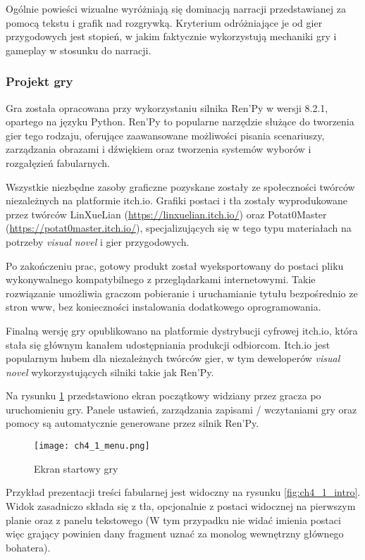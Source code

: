 Ogólnie powieści wizualne wyróżniają się dominacją narracji przedstawianej za pomocą tekstu i grafik nad
rozgrywką. Kryterium odróżniające je od gier przygodowych jest stopień, w jakim faktycznie
wykorzystują mechaniki gry i gameplay w stosunku do narracji\cite{tvtropes_visual_novel}.

\subsubsection*{Projekt gry}

Gra została opracowana przy wykorzystaniu silnika Ren'Py w wersji 8.2.1, opartego na języku Python.
Ren'Py to popularne narzędzie służące do tworzenia gier tego rodzaju, oferujące zaawansowane
możliwości pisania scenariuszy, zarządzania obrazami i dźwiękiem oraz tworzenia systemów wyborów
i rozgałęzień fabularnych.

Wszystkie niezbędne zasoby graficzne pozyskane zostały ze społeczności twórców niezależnych na
platformie itch.io. Grafiki postaci i tła zostały wyprodukowane przez twórców
LinXueLian (\url{https://linxuelian.itch.io/}) oraz Potat0Master (\url{https://potat0master.itch.io/}),
specjalizujących się w tego typu materiałach na potrzeby \textit{visual novel} i gier przygodowych.

Po zakończeniu prac, gotowy produkt został wyeksportowany do postaci pliku wykonywalnego
kompatybilnego z przeglądarkami internetowymi. Takie rozwiązanie umożliwia graczom pobieranie i
uruchamianie tytułu bezpośrednio ze stron www, bez konieczności instalowania dodatkowego
oprogramowania.

Finalną wersję gry opublikowano na platformie dystrybucji cyfrowej itch.io, która stała się
głównym kanałem udostępniania produkcji odbiorcom. Itch.io jest popularnym hubem dla niezależnych
twórców gier, w tym deweloperów \textit{visual novel} wykorzystujących silniki takie jak Ren'Py.

Na rysunku \ref{fig:ch4_1_menu} przedstawiono ekran początkowy widziany przez gracza po uruchomieniu
gry. Panele ustawień, zarządzania zapisami / wczytaniami gry oraz pomocy są automatycznie generowane
przez silnik Ren'Py.

\begin{figure}[h!]
    \centering
    \texttt{[image: ch4\_1\_menu.png]}
    \caption{Ekran startowy gry}
    \label{fig:ch4_1_menu}
\end{figure}

\newpage
Przykład prezentacji treści fabularnej jest widoczny na rysunku \ref{fig:ch4_1_intro}. Widok
zasadniczo składa się z tła, opcjonalnie z postaci widocznej na pierwszym planie oraz z panelu
tekstowego (W tym przypadku nie widać imienia postaci więc grający powinien dany fragment uznać
za monolog wewnętrzny głównego bohatera).

